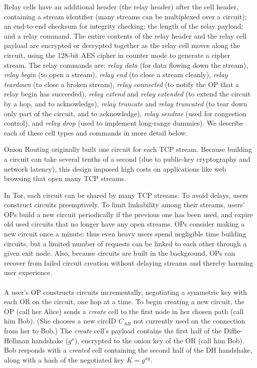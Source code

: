 \documentclass[times,10pt,twocolumn]{article}
\begin{document}
Relay cells have an additional header (the relay header) after the
cell header, containing a stream identifier (many streams can
be multiplexed over a circuit); an end-to-end checksum for integrity
checking; the length of the relay payload; and a relay command.  
The entire contents of the relay header and the relay cell payload 
are encrypted or decrypted together as the relay cell moves along the
circuit, using the 128-bit AES cipher in counter mode to generate a
cipher stream.
The
relay commands are: \emph{relay
data} (for data flowing down the stream), \emph{relay begin} (to open a
stream), \emph{relay end} (to close a stream cleanly), \emph{relay
teardown} (to close a broken stream), \emph{relay connected}
(to notify the OP that a relay begin has succeeded), \emph{relay
extend} and \emph{relay extended} (to extend the circuit by a hop,
and to acknowledge), \emph{relay truncate} and \emph{relay truncated}
(to tear down only part of the circuit, and to acknowledge), \emph{relay
sendme} (used for congestion control), and \emph{relay drop} (used to
implement long-range dummies).
We describe each of these cell types and commands in more detail below.

\label{subsec:circuits}

Onion Routing originally built one circuit for each
TCP stream.  Because building a circuit can take several tenths of a
second (due to public-key cryptography and network latency),
this design imposed high costs on applications like web browsing that
open many TCP streams.

In Tor, each circuit can be shared by many TCP streams.  To avoid
delays, users construct circuits preemptively.  To limit linkability
among their streams, users' OPs build a new circuit
periodically if the previous one has been used,
and expire old used circuits that no longer have any open streams.
OPs consider making a new circuit once a minute: thus
even heavy users spend negligible time
building circuits, but a limited number of requests can be linked
to each other through a given exit node. Also, because circuits are built
in the background, OPs can recover from failed circuit creation
without delaying streams and thereby harming user experience.\\

\label{subsubsec:constructing-a-circuit}\\
A user's OP constructs circuits incrementally, negotiating a
symmetric key with each OR on the circuit, one hop at a time. To begin
creating a new circuit, the OP (call her Alice) sends a
\emph{create} cell to the first node in her chosen path (call him Bob).  
(She chooses a new
circID $C_{AB}$ not currently used on the connection from her to Bob.)
The \emph{create} cell's
payload contains the first half of the Diffie-Hellman handshake
($g^x$), encrypted to the onion key of the OR (call him Bob). Bob
responds with a \emph{created} cell containing the second half of the
DH handshake, along with a hash of the negotiated key $K=g^{xy}$.
\end{document}
